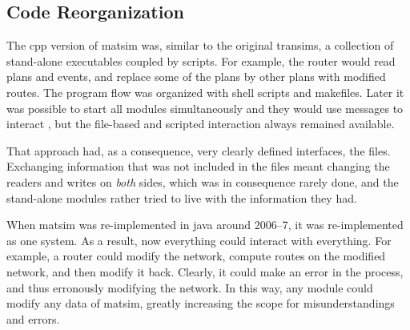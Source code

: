 

%


\subsection{Code Reorganization}
\label{sec:matsim-core-reorg}
The \gls{cpp} version of \gls{matsim} was, similar to the original \gls{transims}, a collection of stand-alone executables coupled by scripts.  For example, the router would read plans and events, and replace some of the plans by other plans with modified routes.  The program flow was organized with shell scripts and makefiles.  Later it was possible to start all modules simultaneously and they would use messages to interact \citep[also see][]{GloorNagel2005ped-att04-birkh}, but the file-based and scripted interaction always remained available.

That approach had, as a consequence, very clearly defined interfaces, \ie the files. Exchanging information that was not included in the files meant changing the readers and writes on \emph{both} sides, which was in consequence rarely done, and the stand-alone modules rather tried to live with the information they had.

When \gls{matsim} was re-implemented in \gls{java} around 2006--7, it was re-implemented as one system.  As a result, now everything could interact with everything.  For example, a router could modify the network, compute routes on the modified network, and then modify it back. Clearly, it could make an error in the process, and thus erronously modifying the network.  In this way, any module could modify any data of \gls{matsim}, greatly increasing the scope for misunderstandings and errors.

